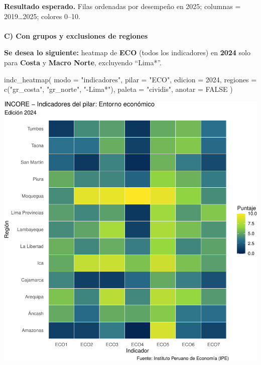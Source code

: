 \documentclass[
  11pt,
  letterpaper,
  DIV=11,
  numbers=noendperiod]{scrartcl}
\makeatletter
\let\oldparagraph\paragraph
\renewcommand{\paragraph}{
    \@ifstar
      \xxxParagraphStar
      \xxxParagraphNoStar
  }
\newcommand{\xxxParagraphStar}[1]{\oldparagraph*{#1}\mbox{}}
\newcommand{\xxxParagraphNoStar}[1]{\oldparagraph{#1}\mbox{}}
\newenvironment{Shaded}{\begin{snugshade}}{\end{snugshade}}
\newcommand{\AttributeTok}[1]{\textcolor[rgb]{0.40,0.45,0.13}{#1}}
\newcommand{\ConstantTok}[1]{\textcolor[rgb]{0.56,0.35,0.01}{#1}}
\newcommand{\DecValTok}[1]{\textcolor[rgb]{0.68,0.00,0.00}{#1}}
\newcommand{\FunctionTok}[1]{\textcolor[rgb]{0.28,0.35,0.67}{#1}}
\newcommand{\NormalTok}[1]{\textcolor[rgb]{0.00,0.23,0.31}{#1}}
\newcommand{\StringTok}[1]{\textcolor[rgb]{0.13,0.47,0.30}{#1}}
\makeatother
\begin{document}
\textbf{Resultado esperado.} Filas ordenadas por desempeño en 2025;
columnas = 2019\ldots2025; colores 0--10.

\paragraph{\texorpdfstring{\textbf{C) Con grupos y exclusiones de
regiones}}{C) Con grupos y exclusiones de regiones}}\label{c-con-grupos-y-exclusiones-de-regiones}

\textbf{Se desea lo siguiente:} heatmap de \textbf{ECO} (todos los
indicadores) en \textbf{2024} solo para \textbf{Costa} y \textbf{Macro
Norte}, excluyendo ``Lima*''.

\begin{Shaded}
\begin{Highlighting}[]
\FunctionTok{indc\_heatmap}\NormalTok{(}
  \AttributeTok{modo       =} \StringTok{"indicadores"}\NormalTok{,}
  \AttributeTok{pilar      =} \StringTok{"ECO"}\NormalTok{,}
  \AttributeTok{edicion    =} \DecValTok{2024}\NormalTok{,}
  \AttributeTok{regiones   =} \FunctionTok{c}\NormalTok{(}\StringTok{"gr\_costa"}\NormalTok{, }\StringTok{"gr\_norte"}\NormalTok{, }\StringTok{"{-}Lima*"}\NormalTok{),}
  \AttributeTok{paleta     =} \StringTok{"cividis"}\NormalTok{,}
  \AttributeTok{anotar     =} \ConstantTok{FALSE}
\NormalTok{)}
\end{Highlighting}
\end{Shaded}

\includegraphics{Manual_files/figure-pdf/unnamed-chunk-102-1.pdf}
\end{document}
